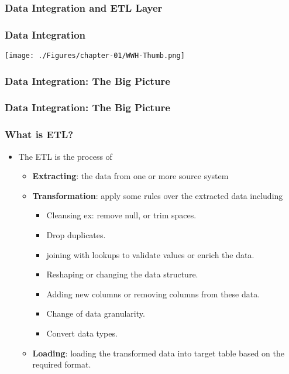 \subsubsection{Data Integration and ETL Layer}

\begin{frame}
	\frametitle{Data Integration}

	\texttt{[image: ./Figures/chapter-01/WWH-Thumb.png]}

\end{frame}
\begin{frame}
	\frametitle{Data Integration: The Big Picture}

	

\end{frame}
\begin{frame}
	\frametitle{Data Integration: The Big Picture}

	

\end{frame}
\begin{frame}
	\frametitle{What is ETL?}

	\begin{itemize}[<+->]
		\item The ETL is the process of
		\begin{itemize}[<+->]
			\item  \textbf{Extracting}: the data from one or more source system
			\item  \textbf{Transformation}: apply some rules over the extracted data including
			\begin{itemize}[<+->]
				\item Cleansing ex: remove null, or trim spaces.
				\item Drop duplicates.
				\item joining with lookups to validate values or enrich the data.
				\item Reshaping or changing the data structure.
				\item Adding new columns or removing columns from these data.
				\item Change of data granularity.
				\item Convert data types.
			\end{itemize}
			\item \textbf{Loading}: loading the transformed data into target table based on the required format.
		\end{itemize}
	\end{itemize}

\end{frame}
